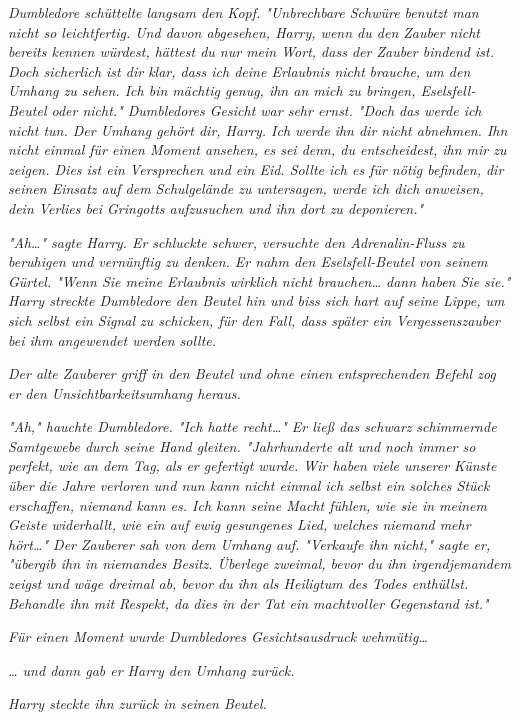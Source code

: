 {\emph{Dumbledore schüttelte langsam den Kopf. "Unbrechbare Schwüre benutzt man nicht so leichtfertig. Und davon abgesehen, Harry, wenn du den Zauber nicht bereits kennen würdest, hättest du nur mein Wort, dass der Zauber bindend ist. Doch sicherlich ist dir klar, dass ich deine Erlaubnis nicht} \emph{\emph{brauche,}} \emph{um den Umhang zu sehen. Ich bin mächtig genug, ihn an mich zu bringen, Eselsfell-Beutel oder nicht." Dumbledores Gesicht war sehr ernst. "Doch das werde ich nicht tun. Der Umhang gehört dir, Harry. Ich werde ihn dir nicht abnehmen. Ihn nicht einmal für einen Moment ansehen, es sei denn, du entscheidest, ihn mir zu zeigen. Dies ist ein Versprechen und ein Eid. Sollte ich es für nötig befinden, dir seinen Einsatz auf dem Schulgelände zu untersagen, werde ich dich anweisen, dein Verlies bei Gringotts aufzusuchen und ihn dort zu deponieren."}

\emph{"Ah…" sagte Harry. Er schluckte schwer, versuchte den Adrenalin-Fluss zu beruhigen und vernünftig zu denken. Er nahm den Eselsfell-Beutel von seinem Gürtel. "Wenn Sie meine Erlaubnis} \emph{\emph{wirklich}} \emph{nicht brauchen… dann haben Sie sie." Harry streckte Dumbledore den Beutel hin und biss sich hart auf seine Lippe, um sich selbst ein Signal zu schicken, für den Fall, dass später ein Vergessenszauber bei ihm angewendet werden sollte.}

\emph{Der alte Zauberer griff in den Beutel und ohne einen entsprechenden Befehl zog er den Unsichtbarkeitsumhang heraus.}

\emph{"Ah," hauchte Dumbledore. "Ich hatte recht…" Er ließ das schwarz} \emph{schimmernde Samtgewebe durch seine Hand gleiten. "Jahrhunderte alt und noch immer so perfekt, wie an dem Tag, als er gefertigt wurde. Wir haben viele unserer Künste über die Jahre verloren und nun kann nicht einmal ich selbst ein solches Stück erschaffen, niemand kann es. Ich kann seine Macht fühlen, wie sie in meinem Geiste widerhallt, wie ein auf ewig gesungenes Lied, welches niemand mehr hört…" Der Zauberer sah von dem Umhang auf. "Verkaufe ihn nicht," sagte er, "übergib ihn in niemandes Besitz. Überlege zweimal, bevor du ihn irgendjemandem zeigst und wäge dreimal ab, bevor du ihn als Heiligtum des Todes enthüllst. Behandle ihn mit Respekt, da dies in der Tat ein machtvoller Gegenstand ist."}

\emph{Für einen Moment wurde Dumbledores Gesichtsausdruck wehmütig…}

\emph{… und dann gab er Harry den Umhang zurück.}

\emph{Harry steckte ihn zurück in seinen Beutel.}

}
